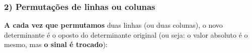 \documentclass[pdftex, brazil, aspectratio=169]{beamer}
\begin{document}
\begin{frame}[t]
  \frametitle{2) Permutações de linhas ou colunas}
  \textbf{A cada vez que permutamos} duas linhas (ou duas colunas), o novo
  determinante é o oposto do determinante original (ou seja: o valor absoluto é
  o mesmo, mas \textbf{o sinal é trocado}):


\end{frame}
\end{document}
